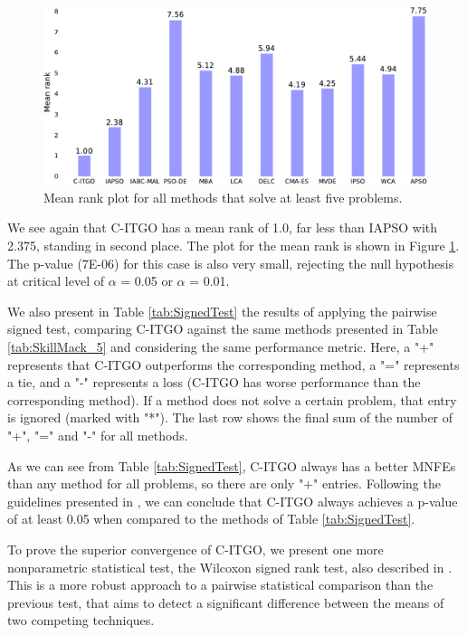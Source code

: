 \begin{figure}[bp]
    \begin{center}
    \includegraphics[scale=0.6]{img/Statistics/SkillMack_5-crop.pdf}
    \end{center}
    \captionsetup{justification=centering}
    \vspace*{-4mm}
    \caption{Mean rank plot for all methods that solve at least five problems.}\label{fig:SkillMack_5}
\end{figure}

We see again that C-ITGO has a mean rank of 1.0, far less than IAPSO with 2.375, standing in second place. The plot for the mean rank is shown in Figure \ref{fig:SkillMack_5}. The p-value (7E-06) for this case is also very small, rejecting the null hypothesis at critical level of $\alpha$ = 0.05 or $\alpha$ = 0.01.


We also present in Table \ref{tab:SignedTest} the results of applying the pairwise signed test, comparing C-ITGO against the same methods presented in Table \ref{tab:SkillMack_5} and considering the same performance metric. Here, a "+" represents that C-ITGO outperforms the corresponding method, a "=" represents a tie, and a "-" represents a loss (C-ITGO has worse performance than the corresponding method). If a method does not solve a certain problem, that entry is ignored (marked with "*"). The last row shows the final sum of the number of "+", "=" and "-" for all methods.



As we can see from Table \ref{tab:SignedTest}, C-ITGO always has a better MNFEs than any method for all problems, so there are only "+" entries. Following the guidelines presented in \cite{Friedman}, we can conclude that C-ITGO always achieves a p-value of at least 0.05 when compared to the methods of Table \ref{tab:SignedTest}.


To prove the superior convergence of C-ITGO, we present one more nonparametric statistical test, the Wilcoxon signed rank test, also described in \cite{Friedman}. This is a more robust approach to a pairwise statistical comparison than the previous test, that aims to detect a significant difference between the means of two competing techniques. 

